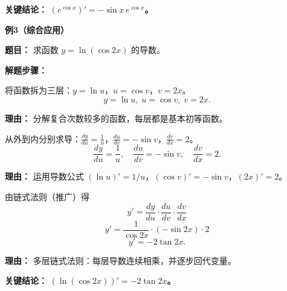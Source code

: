 \begin{examplebox}
	\textbf{\textcolor{CExample}{关键结论：}}
	\textbf{$(e^{\cos x})' = -\sin x\, e^{\cos x}$。}

	\medskip
	\textbf{\textcolor{CExample}{例3（综合应用）}}

	\textbf{\textcolor{CExample}{题目：}}
	求函数 $y = \ln(\cos 2x)$ 的导数。

	\textbf{\textcolor{CExample}{解题步骤：}}
	\begin{description}[style=nextline, leftmargin=2.8em, labelsep=0.5em, itemsep=0.45em]
		\item[\textbf{第一步（逐层分解）：}] 将函数拆为三层：$y=\ln u$，$u=\cos v$，$v=2x$。
			\[
				y=\ln u,\; u=\cos v,\; v=2x.
			\]
			\par\textbf{理由：} 分解复合次数较多的函数，每层都是基本初等函数。
		\item[\textbf{第二步（逐层求导）：}] 从外到内分别求导：$\frac{dy}{du}=\frac{1}{u}$，$\frac{du}{dv}=-\sin v$，$\frac{dv}{dx}=2$。
			\[
				\frac{dy}{du}=\frac{1}{u},\quad \frac{du}{dv}=-\sin v,\quad \frac{dv}{dx}=2.
			\]
			\par\textbf{理由：} 运用导数公式 $(\ln u)'=1/u$，$(\cos v)'=-\sin v$，$(2x)'=2$。
		\item[\textbf{第三步（相乘回代）：}] 由链式法则（推广）得
			\[
				y' = \frac{dy}{du}\cdot\frac{du}{dv}\cdot\frac{dv}{dx}
			\]
			\[
				y' = \frac{1}{\cos 2x}\cdot(-\sin 2x)\cdot 2
			\]
			\[
				y' = -2\tan 2x.
			\]
			\par\textbf{理由：} 多层链式法则：每层导数连续相乘，并逐步回代变量。
	\end{description}

	\textbf{\textcolor{CExample}{关键结论：}}
	\textbf{$(\ln(\cos 2x))' = -2\tan 2x$。}
\end{examplebox}
